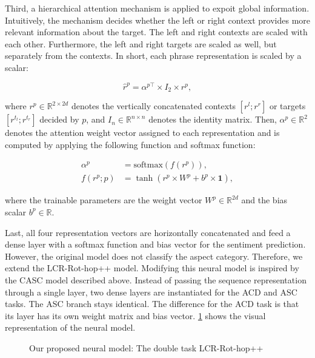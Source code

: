 \documentclass[american, oneside]{ecsgdp}
\begin{document}
Third, a hierarchical attention mechanism is applied to expoit global information. Intuitively, the mechanism decides whether the left or right context provides more relevant information about the target. The left and right contexts are scaled with each other. Furthermore, the left and right targets are scaled as well, but separately from the contexts. In short, each phrase representation is scaled by a scalar:

\begin{equation}
    \hat{r}^p = \alpha^{p\top} \times I_2 \times  r^p , \label{eq:hier_att}
\end{equation}

\noindent where $r^p \in \mathbb{R}^{2 \times 2d}$ denotes the vertically concatenated contexts $[r^l; r^r]$ or targets $[r^{t_l}; r^{t_r}]$ decided by $p$, and $I_n \in \mathbb{R}^{n \times n}$ denotes the identity matrix. Then, $\alpha^p \in \mathbb{R}^2$ denotes the attention weight vector assigned to each representation and is computed by applying the following function and softmax function:

\begin{align}
    \alpha^p                         & = \text{softmax}\left( f \left( r^p\right) \right), \label{eq:hier_alpha}\\
    f \left( r^p; p \right) & = \tanh{\left( r^{p} \times W^p + b^p \times \mathbf{1} \right)}, \label{eq:hier_tanh}
\end{align}

\noindent where the trainable parameters are the weight vector $W^p \in \mathbb{R}^{2d}$ and the bias scalar $b^p \in \mathbb{R}$. 

Last, all four representation vectors are horizontally concatenated and feed a dense layer with a softmax function and bias vector for the sentiment prediction. However, the original model does not classify the aspect category. Therefore, we extend the LCR-Rot-hop++ model. Modifying this neural model is inspired by the CASC model described above. Instead of passing the sequence representation through a single layer, two dense layers are instantiated for the ACD and ASC tasks. The ASC branch stays identical. The difference for the ACD task is that its layer has its own weight matrix and bias vector. \cref{fig:CASC+LCR} shows the visual representation of the neural model.

\begin{figure}[htbp]
  \centering
  
  \caption{Our proposed neural model: The double task LCR-Rot-hop++}
  \label{fig:CASC+LCR}
\end{figure}
\end{document}
